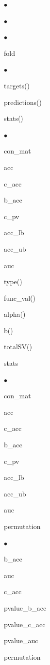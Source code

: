 \begin{list}{$\bullet$}
\begin{list}{$\bullet$}
\begin{list}{$\bullet$}
\item fold
\begin{list}{$\bullet$}
	{\setlength{\labelsep}{.2cm}\setlength{\itemindent}{0cm}\setlength{\leftmargin}{1.7cm}}
\item targets()
\item predictions()
\item stats()
\begin{list}{$\bullet$}
	{\setlength{\labelsep}{.2cm}\setlength{\itemindent}{0cm}\setlength{\leftmargin}{2.2cm}}
\item con\_mat
\item acc
\item c\_acc
\item b\_acc
\item c\_pv
\item acc\_lb
\item acc\_ub
\item auc
\end{list}
\item type()
\item func\_val()
\item alpha()
\item b()
\item totalSV()
\end{list}
\item stats
\begin{list}{$\bullet$}
	{\setlength{\labelsep}{.2cm}\setlength{\itemindent}{0cm}\setlength{\leftmargin}{1.7cm}}
\item con\_mat
\item acc
\item c\_acc
\item b\_acc
\item c\_pv
\item acc\_lb
\item acc\_ub
\item auc
\item permutation
\begin{list}{$\bullet$}
	{\setlength{\labelsep}{.2cm}\setlength{\itemindent}{0cm}\setlength{\leftmargin}{2.2cm}}
\item b\_acc
\item auc
\item c\_acc
\item pvalue\_b\_acc
\item pvalue\_c\_acc
\item pvalue\_auc
\end{list}
\end{list}
\item permutation

\end{list}
\end{list}
\end{list}
